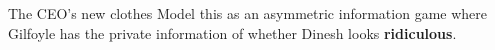 
\begin{frame}{The CEO's new clothes}
  Model this as an asymmetric information game 
  where \alert{Gilfoyle} has the private information 
  of whether \alert{Dinesh} looks \textbf{ridiculous}.
  \vspace{60mm}
\end{frame}


\begin{frame}{}
  
\end{frame}
